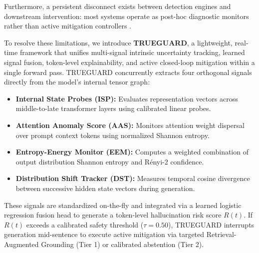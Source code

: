 \documentclass[journal]{IEEEtran}
\begin{document}
Furthermore, a persistent disconnect exists between detection engines and downstream intervention: most systems operate as post-hoc diagnostic monitors rather than active mitigation controllers \cite{dhuliawala2024chain}.

To resolve these limitations, we introduce \textbf{TRUEGUARD}, a lightweight, real-time framework that unifies multi-signal intrinsic uncertainty tracking, learned signal fusion, token-level explainability, and active closed-loop mitigation within a single forward pass. TRUEGUARD concurrently extracts four orthogonal signals directly from the model's internal tensor graph:
\begin{itemize}
    \item \textbf{Internal State Probes (ISP):} Evaluates representation vectors across middle-to-late transformer layers using calibrated linear probes.
    \item \textbf{Attention Anomaly Score (AAS):} Monitors attention weight dispersal over prompt context tokens using normalized Shannon entropy.
    \item \textbf{Entropy-Energy Monitor (EEM):} Computes a weighted combination of output distribution Shannon entropy and R\'enyi-2 confidence.
    \item \textbf{Distribution Shift Tracker (DST):} Measures temporal cosine divergence between successive hidden state vectors during generation.
\end{itemize}

These signals are standardized on-the-fly and integrated via a learned logistic regression fusion head to generate a token-level hallucination risk score $R(t)$. If $R(t)$ exceeds a calibrated safety threshold ($\tau = 0.50$), TRUEGUARD interrupts generation mid-sentence to execute active mitigation via targeted Retrieval-Augmented Grounding (Tier 1) or calibrated abstention (Tier 2).
\end{document}
